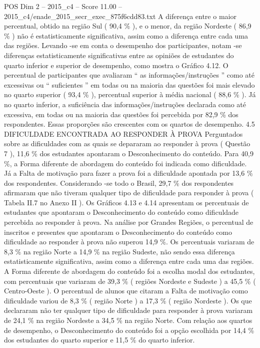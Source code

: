 \begin{textsample}{POS Dim 2 – 2015\_c4 – Score 11.00 – 2015\_c4/enade\_2015\_secr\_exec\_875f6cdd83.txt}
A diferença entre o maior percentual, obtido na região Sul ( 90,4 \% ), e o menor, da região Nordeste ( 86,9 \% ) não é estatisticamente significativa, assim como a diferença entre cada uma das regiões.
Levando -se em conta o desempenho dos participantes, notam -se diferenças estatisticamente significativas entre as opiniões de estudantes do quarto inferior e superior de desempenho, como mostra o Gráfico 4.12.
O percentual de participantes que avaliaram “ as informações/instruções ” como até excessivas ou “ suficientes ” em todas ou na maioria das questões foi mais elevado no quarto superior ( 93,4 \% ), percentual superior à média nacional ( 88,6 \% ).
Já no quarto inferior, a suficiência das informações/instruções declarada como até excessiva, em todas ou na maioria das questões foi percebida por 82,9 \% dos respondentes.
Essas proporções são crescentes com os quartos de desempenho. 4.5 DIFICULDADE ENCONTRADA AO RESPONDER À PROVA Perguntados sobre as dificuldades com as quais se depararam ao responder à prova ( Questão 7 ), 11,6 \% dos estudantes apontaram o Desconhecimento do conteúdo.
Para 40,9 \%, a Forma diferente de abordagem do conteúdo foi indicada como dificuldade.
Já a Falta de motivação para fazer a prova foi a dificuldade apontada por 13,6 \% dos respondentes.
Considerando -se todo o Brasil, 29,7 \% dos respondentes afirmaram que não tiveram qualquer tipo de dificuldade para responder à prova ( Tabela II.7 no Anexo II ).
Os Gráficos 4.13 e 4.14 apresentam os percentuais de estudantes que apontaram o Desconhecimento do conteúdo como dificuldade percebida ao responder à prova.
Na análise por Grandes Regiões, o percentual de inscritos e presentes que apontaram o Desconhecimento do conteúdo como dificuldade ao responder à prova não superou 14,9 \%.
Os percentuais variaram de 8,3 \% na região Norte a 14,9 \% na região Sudeste, não sendo essa diferença estatisticamente significativa, assim como a diferença entre cada uma das regiões.
A Forma diferente de abordagem do conteúdo foi a escolha modal dos estudantes, com percentuais que variaram de 39,3 \% ( regiões Nordeste e Sudeste ) a 45,5 \% ( Centro-Oeste ).
O percentual de alunos que citaram a Falta de motivação como dificuldade variou de 8,3 \% ( região Norte ) a 17,3 \% ( região Nordeste ).
Os que declararam não ter qualquer tipo de dificuldade para responder à prova variaram de 24,1 \% na região Nordeste a 34,5 \% na região Norte.
Com relação aos quartos de desempenho, o Desconhecimento do conteúdo foi a opção escolhida por 14,4 \% dos estudantes do quarto superior e 11,5 \% do quarto inferior.

\end{textsample}
